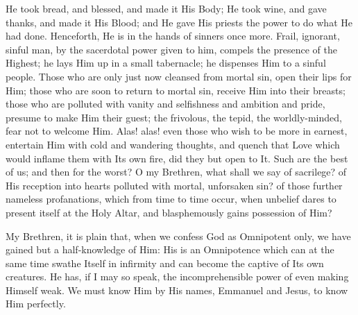 He took bread, and blessed, and made it His Body; He
took wine, and gave thanks, and made it His Blood; and He
gave His priests the power to do what He had done.
Henceforth, He is in the hands of sinners once more.
Frail, ignorant, sinful man, by the sacerdotal power
given to him, compels the presence of the Highest; he
lays Him up in a small tabernacle; he dispenses Him to a
sinful people. Those who are only just now cleansed from
mortal sin, open their lips for Him; those who are soon
to return to mortal sin, receive Him into their breasts;
those who are polluted with vanity and selfishness and
ambition and pride, presume to make Him their guest; the
frivolous, the tepid, the worldly-minded, fear not to
welcome Him. Alas! alas! even those who wish to be more
in earnest, entertain Him with cold and wandering
thoughts, and quench that Love which would inflame them
with Its own fire, did they but open to It. Such are the
best of us; and then for the worst? O my Brethren, what
shall we say of sacrilege? of His reception into hearts
polluted with mortal, unforsaken sin? of those further
nameless profanations, which from time to time occur,
when unbelief dares to present itself at the Holy Altar,
and blasphemously gains possession of Him?

My Brethren, it is plain that, when we confess God as
Omnipotent only, we have gained but a half-knowledge of
Him: His is an Omnipotence which can at the same time
swathe Itself in infirmity and can become the captive of
Its own creatures. He has, if I may so speak, the
incomprehensible power of even making Himself weak. We
must know Him by His names, Emmanuel and Jesus, to know
Him perfectly.

